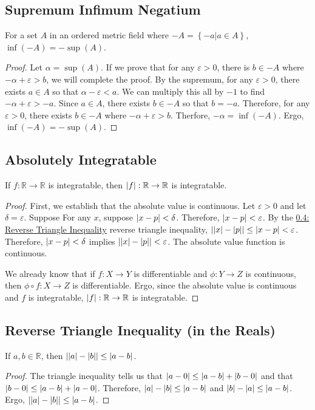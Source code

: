\documentclass[11pt]{article}
\begin{document}
    \subsection{Supremum Infimum Negatium}
        \label{thm:2}
        For a set $A$ in an ordered metric field where $-A = \left\{ -a \Big| a \in A \right\}$, $\inf(-A) = -\sup(A)$.
        \begin{proof}
            Let $\alpha = \sup(A)$.
            If we prove that for any $\varepsilon > 0$, there is $b \in -A$ where $-\alpha + \varepsilon > b$, we will complete the proof.
            By the supremum, for any $\varepsilon > 0$, there exists $a \in A$ so that $\alpha - \varepsilon < a$.
            We can multiply this all by $-1$ to find $-\alpha + \varepsilon > -a$.
            Since $a \in A$, there exists $b \in -A$ so that $b = -a$.
            Therefore, for any $\varepsilon > 0$, there exists $b \in -A$ where $-\alpha + \varepsilon > b$.
            Therfore, $-\alpha = \inf(-A)$.
            Ergo, $\inf(-A) = -\sup(A)$.
        \end{proof}

    \subsection{Absolutely Integratable}
        \label{thm:3}
        If $f: \mathbb{R} \to \mathbb{R}$ is integratable, then $\left| f \right|: \mathbb{R} \to \mathbb{R}$ is integratable.
        \begin{proof}
            First, we establish that the absolute value is continuous.
            Let $\varepsilon > 0$ and let $\delta = \varepsilon$.
            Suppose For any $x$, suppose $\left| x - p \right| < \delta$.
            Therefore, $\left| x - p \right| < \varepsilon$.
            By the \hyperref[thm:4]{0.4: Reverse Triangle Inequality} reverse triangle inequality, $\left| \left| x \right| - \left| p \right| \right| \leq \left| x - p \right| < \varepsilon$.
            Therefore, $\left| x - p \right| < \delta$ implies $\left| \left| x \right| - \left| p \right| \right| < \varepsilon$.
            The absolute value function is continuous.

            We already know that if $f: X \to Y$ is differentiable and $\phi: Y \to Z$ is continuous, then $\phi \circ f: X \to Z$ is differentiable.
            Ergo, since the absolute value is continuous and $f$ is integratable, $\left| f \right|: \mathbb{R} \to \mathbb{R}$ is integratable.
        \end{proof}

    \subsection{Reverse Triangle Inequality (in the Reals)}
        \label{thm:4}
        If $a,b \in \mathbb{R}$, then $\left| \left| a \right| - \left| b \right| \right| \leq \left| a - b \right|$.
        \begin{proof}
            The triangle inequality tells us that $\left| a - 0 \right| \leq \left| a - b \right| + \left| b - 0 \right|$ and that $\left| b - 0 \right| \leq \left| a - b \right| + \left| a - 0 \right|$.
            Therefore, $\left| a \right| - \left| b \right| \leq \left| a - b \right|$ and $\left| b \right| - \left| a \right| \leq \left| a - b \right|$.
            Ergo, $\left| \left| a \right| - \left| b \right| \right| \leq \left| a - b \right|$.
        \end{proof}
\end{document}
